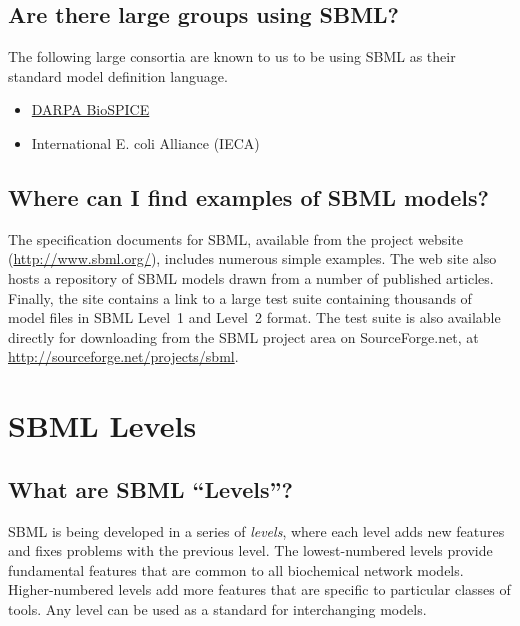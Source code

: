 \documentclass{sbmlfaq}
\begin{document}
%

\subsection{Are there large groups using SBML?}

The following large consortia are known to us to be using SBML as their
standard model definition language.
\begin{itemize}\setlength{\parskip}{-1ex}
\item \href{https://community.biospice.org/}{DARPA BioSPICE}
\item International E. coli Alliance (IECA)
\end{itemize}


\subsection{Where can I find examples of SBML models?}

The specification documents for SBML, available from the project website
(\url{http://www.sbml.org/}), includes numerous simple examples.  The web
site also hosts a repository of SBML models drawn from a number of
published articles.  Finally, the site contains a link to a large test
suite containing thousands of model files in SBML Level~1 and Level~2
format.  The test suite is also available directly for downloading from the
SBML project area on SourceForge.net, at
\url{http://sourceforge.net/projects/sbml}.


\section{SBML Levels}
\label{sec:sbml-levels}

\subsection{What are SBML ``Levels''?}

SBML is being developed in a series of \emph{levels}, where each level adds
new features and fixes problems with the previous level.  The
lowest-numbered levels provide fundamental features that are common to all
biochemical network models.  Higher-numbered levels add more features that
are specific to particular classes of tools.  Any level can be used as a
standard for interchanging models.
\end{document}
